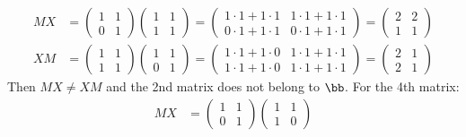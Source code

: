 \begin{problems}
\begin{sol}
\begin{align*}
            MX & = 
            \begin{pmatrix}
                1 & 1 \\
                0 & 1
            \end{pmatrix}
            \begin{pmatrix}
                1 & 1 \\
                1 & 1
            \end{pmatrix} = 
            \begin{pmatrix}
                1 \cdot 1 + 1 \cdot 1 & 1 \cdot 1 + 1 \cdot 1 \\
                0 \cdot 1 + 1 \cdot 1 & 0 \cdot 1 + 1 \cdot 1
            \end{pmatrix} = 
            \begin{pmatrix}
                2 & 2 \\ 1 & 1
            \end{pmatrix} \\
            XM & = 
            \begin{pmatrix}
                1 & 1 \\
                1 & 1 
            \end{pmatrix}
            \begin{pmatrix}
                1 & 1 \\
                0 & 1
            \end{pmatrix} = 
            \begin{pmatrix}
                1 \cdot 1 + 1 \cdot 0 & 1 \cdot 1 + 1 \cdot 1 \\
                1 \cdot 1 + 1 \cdot 0 & 1 \cdot 1 + 1 \cdot 1 
            \end{pmatrix} =
            \begin{pmatrix}
                2 & 1 \\
                2 & 1
            \end{pmatrix}
        \end{align*}
        Then $MX \neq XM$ and the 2nd matrix does not belong to $\bb$. For the 4th matrix:
        \begin{align*}
            MX & = 
            \begin{pmatrix}
                1 & 1 \\
                0 & 1 
            \end{pmatrix}
            \begin{pmatrix}
                1 & 1 \\
                1 & 0

\end{pmatrix}
\end{align*}
\end{sol}
\end{problems}
